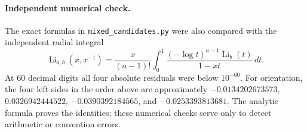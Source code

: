 \paragraph{Independent numerical check.}
The exact formulas in \texttt{mixed\_candidates.py} were also compared
with the independent radial integral
\[
 \operatorname{Li}_{a,b}(x,x^{-1})
 =\frac{x}{(a-1)!}\int_0^1
       \frac{(-\log t)^{a-1}\operatorname{Li}_b(t)}{1-xt}\,dt.
\]
At 60 decimal digits all four absolute residuals were below $10^{-60}$.
For orientation, the four left sides in the order above are approximately
$-0.0134202673573$, $0.0326942444522$,
$-0.0390392184565$, and $-0.0253393813681$.
The analytic formula proves the identities; these numerical checks serve
only to detect arithmetic or convention errors.

